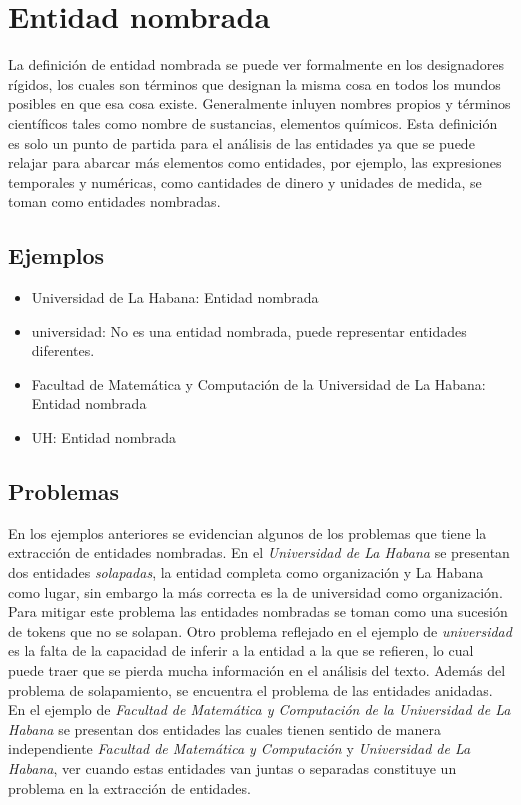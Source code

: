 \documentclass[runningheads]{llncs}
\begin{document}
\section{Entidad nombrada}

La definición de entidad nombrada se puede ver formalmente en los designadores rígidos\cite{rigid_designator}, los cuales son términos que designan la misma cosa en todos los mundos posibles en que esa cosa existe. Generalmente inluyen nombres propios y términos científicos tales como nombre de sustancias, elementos químicos. Esta definición es solo un punto de partida para el análisis de las entidades ya que se puede relajar  para abarcar más elementos como entidades, por ejemplo, las expresiones temporales y numéricas, como cantidades de dinero y unidades de medida, se toman como entidades nombradas. 

\subsection{Ejemplos}

\begin{itemize}

\item Universidad de La Habana: Entidad nombrada
\item universidad: No es una entidad nombrada, puede representar entidades diferentes.
\item Facultad de Matemática y Computación de la Universidad de La Habana: Entidad nombrada
\item UH: Entidad nombrada
\end{itemize}

\subsection{Problemas}

En los ejemplos anteriores se evidencian algunos de los problemas que tiene la extracción de entidades nombradas. En el \emph{Universidad de La Habana} se presentan dos entidades \emph{solapadas}, la entidad completa como organización y La Habana como lugar, sin embargo la más correcta es la de universidad como organización. Para mitigar este problema las entidades nombradas se toman como una sucesión de tokens que no se solapan. Otro problema reflejado en el ejemplo de \emph{universidad} es la falta de la capacidad de inferir a la entidad a la que se refieren, lo cual puede traer que se pierda mucha información en el análisis del texto. Además del problema de solapamiento, se encuentra el problema de las entidades anidadas. En el ejemplo de \emph{Facultad de Matemática y Computación de la Universidad de La Habana} se presentan dos entidades las cuales tienen sentido de manera independiente \emph{Facultad de Matemática y Computación} y \emph{Universidad de La Habana}, ver cuando estas entidades van juntas o separadas constituye un problema en la extracción de entidades.
\end{document}
